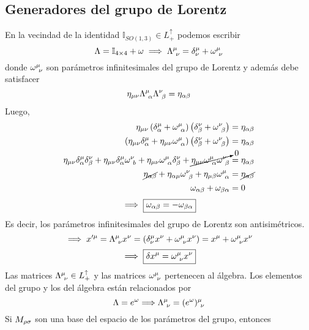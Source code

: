 \subsection{Generadores del grupo de Lorentz}
En la vecindad de la identidad $\mathbb{I}_{SO(1,3)}\in L^\uparrow_+ $ podemos escribir
\begin{equation}
  \Lambda=\mathbb{I}_{4\times 4}+\omega \implies \Lambda^\mu_{~\nu }=\delta^\mu_\nu +\omega^\mu_{~\nu }
\end{equation}
donde $\omega^\mu_{~\nu }$ son parámetros infinitesimales del grupo de Lorentz y además debe satisfacer
\begin{equation}
 \eta_{\mu\nu }\Lambda^\mu_{~\alpha} \Lambda^\nu _{~\beta }=\eta_{\alpha\beta  }
\end{equation}
Luego,
\begin{align}
  \eta_{\mu\nu }\left(\delta^\mu_\alpha +\omega^\mu_{~\alpha }\right)\left(\delta^\nu_\beta  +\omega^\nu_{~\beta  }\right)&=\eta_{\alpha\beta }\\
  \left(\eta_{\mu\nu}\delta^\mu_\alpha+\eta_{\mu\nu }\omega^\mu_{~\alpha }\right)\left(\delta^\nu_\beta  +\omega^\nu_{~\beta  }\right)&=\eta_{\alpha\beta }\\
  \eta_{\mu\nu}\delta^\mu_\alpha\delta^\nu_\beta +\eta_{\mu\nu}\delta^\mu_\alpha\omega^\nu_{~b}+\eta_{\mu\nu }\omega^\mu_{~\alpha }\delta^\nu_\beta+\cancelto{0}{\eta_{\mu\nu }\omega^\mu_{~\alpha }\omega^\nu_{~\beta}}&=\eta_{\alpha\beta }\\
  \cancel{\eta_{\alpha\beta }}+\eta_{\alpha\mu }\omega^\nu _{~\beta }+\eta_{\mu\beta }\omega^\mu_{~\alpha}&=\cancel{\eta_{\alpha\beta }}\\
  \omega_{\alpha\beta }+\omega_{\beta\alpha}&=0
\end{align}
\begin{equation}
  \implies \boxed{\omega_{\alpha\beta}=-\omega_{\beta\alpha }}
\end{equation}
Es decir, los parámetros infinitesimales del grupo de Lorentz son antisimétricos.
\begin{equation}
  \implies x'^\mu =\Lambda^\mu_{~\nu } x^\nu =(\delta^\mu_\nu x^\nu+\omega^\mu_{~\nu } x^\nu )=x^\mu +\omega^\mu_{~\nu } x^\nu 
\end{equation}
\begin{equation}\label{12.1}
  \implies\boxed{ \delta x^\mu =\omega^\mu_{~\nu } x^\nu }
\end{equation}
Las matrices $\Lambda^\mu_{~\nu }\in L^\uparrow_+$ y las matrices $\omega^\mu_{~\nu }$ pertenecen al álgebra. Los elementos del grupo y los del álgebra están relacionados por
\begin{equation}
  \Lambda=e^\omega \Longrightarrow \Lambda^\mu_{~\nu } =(e^\omega )^\mu_{~\nu }
\end{equation}
Si $M_{\rho\sigma }$ son una base del espacio de los parámetros del grupo, entonces
